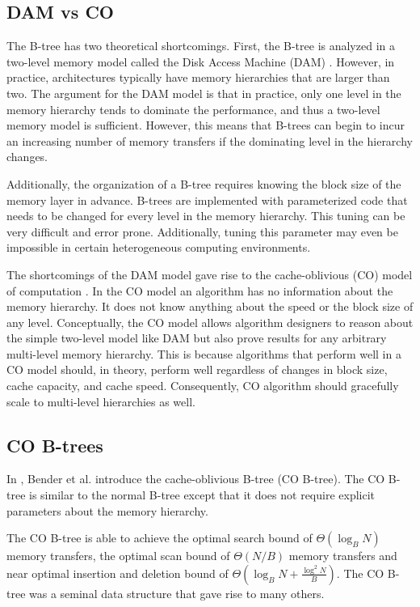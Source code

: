 \documentclass[preprint]{style}
\begin{document}
\subsection{DAM vs CO}

The B-tree has two theoretical shortcomings. First, the B-tree is analyzed in a
two-level memory model called the Disk Access Machine (DAM) \cite{Aggarwal}.
However, in practice, architectures typically have memory hierarchies that are
larger than two. The argument for the DAM model is that in practice, only one
level in the memory hierarchy tends to dominate the performance, and thus a
two-level memory model is sufficient.  However, this means that B-trees can
begin to incur an increasing number of memory transfers if the dominating level
in the hierarchy changes.

Additionally, the organization of a B-tree requires knowing the block size of
the memory layer in advance. B-trees are implemented with parameterized code
that needs to be changed for every level in the memory hierarchy. This tuning
can be very difficult and error prone. Additionally, tuning this parameter may
even be impossible in certain heterogeneous computing environments.

The shortcomings of the DAM model gave rise to the cache-oblivious (CO) model
of computation \cite{Frigo99}. In the CO model an algorithm has no information
about the memory hierarchy. It does not know anything about the speed or the
block size of any level. Conceptually, the CO model allows algorithm designers
to reason about the simple two-level model like DAM but also prove results for
any arbitrary multi-level memory hierarchy. This is because algorithms that
perform well in a CO model should, in theory, perform well regardless of
changes in block size, cache capacity, and cache speed. Consequently, CO
algorithm should gracefully scale to multi-level hierarchies as well.

\subsection{CO B-trees}

In \cite{BenderDemainColton}, Bender et al. introduce the cache-oblivious
B-tree (CO B-tree). The CO B-tree is similar to the normal B-tree except that
it does not require explicit parameters about the memory hierarchy.

The CO B-tree is able to achieve the optimal search bound of
$\Theta(\log_{B}{N})$ memory transfers, the optimal scan bound of $\Theta(N/B)$
memory transfers and near optimal insertion and deletion bound of 
$\Theta(\log_{B}{N} + \frac{\log^2{N}}{B})$. 
The CO B-tree was a seminal data structure that gave rise to many others.
\end{document}
